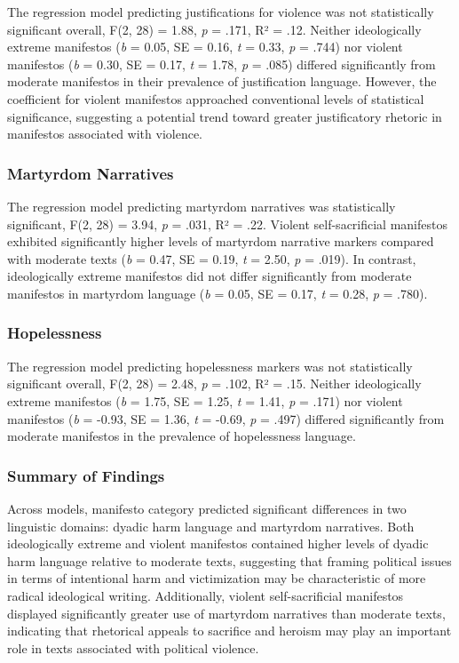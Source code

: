 \documentclass[
  english,
  man,floatsintext]{apa6}
\begin{document}
The regression model predicting justifications for violence was not statistically significant overall, F(2, 28) = 1.88, \emph{p} = .171, R² = .12. Neither ideologically extreme manifestos (\emph{b} = 0.05, SE = 0.16, \emph{t} = 0.33, \emph{p} = .744) nor violent manifestos (\emph{b} = 0.30, SE = 0.17, \emph{t} = 1.78, \emph{p} = .085) differed significantly from moderate manifestos in their prevalence of justification language. However, the coefficient for violent manifestos approached conventional levels of statistical significance, suggesting a potential trend toward greater justificatory rhetoric in manifestos associated with violence.

\subsubsection{Martyrdom Narratives}\label{martyrdom-narratives}

The regression model predicting martyrdom narratives was statistically significant, F(2, 28) = 3.94, \emph{p} = .031, R² = .22. Violent self-sacrificial manifestos exhibited significantly higher levels of martyrdom narrative markers compared with moderate texts (\emph{b} = 0.47, SE = 0.19, \emph{t} = 2.50, \emph{p} = .019). In contrast, ideologically extreme manifestos did not differ significantly from moderate manifestos in martyrdom language (\emph{b} = 0.05, SE = 0.17, \emph{t} = 0.28, \emph{p} = .780).

\subsubsection{Hopelessness}\label{hopelessness}

The regression model predicting hopelessness markers was not statistically significant overall, F(2, 28) = 2.48, \emph{p} = .102, R² = .15. Neither ideologically extreme manifestos (\emph{b} = 1.75, SE = 1.25, \emph{t} = 1.41, \emph{p} = .171) nor violent manifestos (\emph{b} = -0.93, SE = 1.36, \emph{t} = -0.69, \emph{p} = .497) differed significantly from moderate manifestos in the prevalence of hopelessness language.

\subsubsection{Summary of Findings}\label{summary-of-findings}

Across models, manifesto category predicted significant differences in two linguistic domains: dyadic harm language and martyrdom narratives. Both ideologically extreme and violent manifestos contained higher levels of dyadic harm language relative to moderate texts, suggesting that framing political issues in terms of intentional harm and victimization may be characteristic of more radical ideological writing. Additionally, violent self-sacrificial manifestos displayed significantly greater use of martyrdom narratives than moderate texts, indicating that rhetorical appeals to sacrifice and heroism may play an important role in texts associated with political violence.
\end{document}
